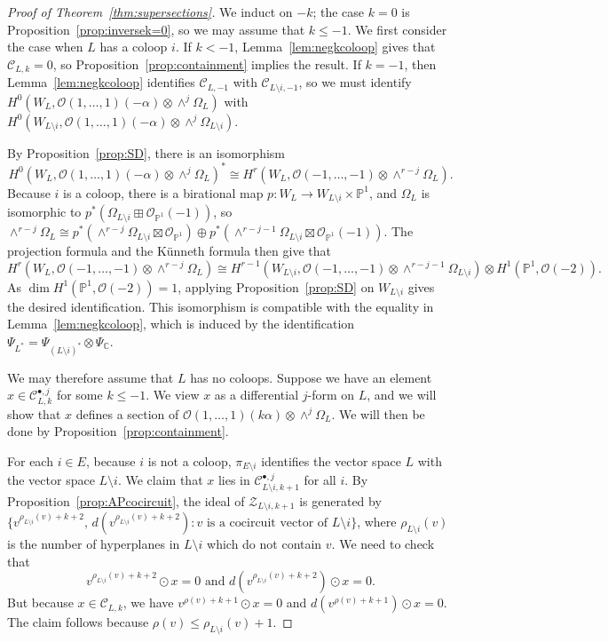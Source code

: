 \documentclass{amsart}
\theoremstyle{definition}
\begin{document}
\begin{proof}[Proof of Theorem~\ref{thm:supersections}]
We induct on $-k$; the case $k=0$ is Proposition~\ref{prop:inversek=0}, so we may assume that $k \le -1$. We first consider the case when $L$ has a coloop $i$. If $k < -1$, Lemma~\ref{lem:negkcoloop} gives that $\mathcal{C}_{L, k} = 0$, so Proposition~\ref{prop:containment} implies the result. If $k = -1$, then Lemma~\ref{lem:negkcoloop} identifies $\mathcal{C}_{L, -1}$ with $\mathcal{C}_{L \setminus i, -1}$, so we must identify $H^0(W_L, \mathcal{O}(1, \dotsc, 1)(-\alpha) \otimes \wedge^j \Omega_L)$ with $H^0(W_{L \setminus i}, \mathcal{O}(1, \dotsc, 1)(-\alpha) \otimes \wedge^j \Omega_{L \setminus i})$. 

By Proposition~\ref{prop:SD}, there is an isomorphism
$$ H^0(W_L, \mathcal{O}(1, \dotsc, 1)(-\alpha) \otimes \wedge^j \Omega_L)^* \cong H^r(W_L, \mathcal{O}(-1, \dotsc, -1) \otimes \wedge^{r-j} \Omega_L).$$
Because $i$ is a coloop, there is a birational map $p \colon W_L \to W_{L \setminus i} \times \mathbb{P}^1$, and $\Omega_L$ is isomorphic to $p^*(\Omega_{L \setminus i} \boxplus \mathcal{O}_{\mathbb{P}^1}(-1))$, so $ \wedge^{r-j} \Omega_L \cong p^*( \wedge^{r-j} \Omega_{L \setminus i} \boxtimes \mathcal{O}_{\mathbb{P}^1}) \oplus p^*(\wedge^{r-j-1} \Omega_{L \setminus i} \boxtimes \mathcal{O}_{\mathbb{P}^1}(-1))$. 
The projection formula and the K\"{u}nneth formula then give that 
$$H^r(W_L, \mathcal{O}(-1, \dotsc, -1) \otimes \wedge^{r-j} \Omega_L) \cong H^{r-1}(W_{L \setminus i}, \mathcal{O}(-1, \dotsc, -1) \otimes \wedge^{r-j-1} \Omega_{L \setminus i}) \otimes H^1(\mathbb{P}^1, \mathcal{O}(-2)).$$
As $\dim H^1(\mathbb{P}^1, \mathcal{O}(-2)) = 1$, applying Proposition~\ref{prop:SD} on $W_{L \setminus i}$ gives the desired identification. This isomorphism is compatible with the equality in Lemma~\ref{lem:negkcoloop}, which is induced by the identification $\Psi_{L^*} = \Psi_{(L \setminus i)^*} \otimes \Psi_{\mathbb{C}}$. 

We may therefore assume that $L$ has no coloops. Suppose we have an element $x \in \mathcal{C}_{L, k}^{\bullet, j}$ for some $k \le -1$. We view $x$ as a differential $j$-form on $L$, and we will show that $x$ defines a section of $\mathcal{O}(1, \dotsc, 1)(k\alpha) \otimes \wedge^j \Omega_L$. 
We will then be done by Proposition~\ref{prop:containment}. 

For each $i \in E$, because $i$ is not a coloop, $\pi_{E \setminus i}$ identifies the vector space $L$ with the vector space $L \setminus i$. We claim that $x$ lies in $\mathcal{C}_{L \setminus i, k+1}^{\bullet, j}$ for all $i$. By Proposition~\ref{prop:APcocircuit}, the ideal of $\mathcal{Z}_{L \setminus i, k+1}$ is generated by $\{v^{\rho_{L \setminus i}(v) + k + 2}, \, d(v^{\rho_{L \setminus i}(v) + k + 2}) : v \text{ is a cocircuit vector of }L \setminus i\}$, where $\rho_{L \setminus i}(v)$ is the number of hyperplanes in $L \setminus i$ which do not contain $v$. We need to check that
$$v^{\rho_{L \setminus i}(v) + k + 2} \odot x = 0 \text{ and }d(v^{\rho_{L \setminus i}(v) + k + 2}) \odot x = 0.$$
But because $x \in \mathcal{C}_{L, k}$, we have
$v^{\rho(v) + k + 1} \odot x = 0$ and $d(v^{\rho(v) + k + 1}) \odot x = 0.$
The claim follows because $\rho(v) \le \rho_{L \setminus i}(v) + 1$. 


\end{proof}
\end{document}

